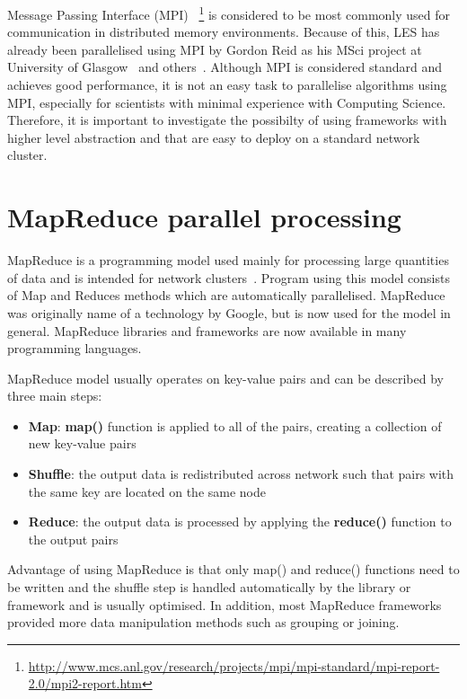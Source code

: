 \documentclass{l4proj}
\begin{document}
Message Passing Interface (MPI)
~\footnote{\url{http://www.mcs.anl.gov/research/projects/mpi/mpi-standard/mpi-report-2.0/mpi2-report.htm}} 
is considered to be most commonly used for communication in distributed memory environments.
Because of this, LES has already been parallelised using MPI by Gordon Reid as his MSci project at University of Glasgow~\cite{les_mpi} and others~\cite{les_palm}. Although MPI is considered standard and achieves good performance, it
is not an easy task to parallelise algorithms using MPI, especially for scientists with minimal
experience with Computing Science. Therefore, it is important to investigate the possibilty
of using frameworks with higher level abstraction and that are easy to deploy on a standard
network cluster.

\section{MapReduce parallel processing}

MapReduce is a programming model used mainly for processing large quantities of data
and is intended for network clusters~\cite{map_reduce}. Program using this model consists of Map and Reduces
methods which are automatically parallelised. MapReduce was originally name of a technology by
Google, but is now used for the model in general. MapReduce libraries and frameworks are now 
available in many programming languages.

MapReduce model usually operates on key-value pairs and can be described by three main steps:

\begin{itemize}  
\item \textbf{Map}: \textbf{map()} function is applied to all of the pairs, creating a collection of new key-value pairs
\item \textbf{Shuffle}: the output data is redistributed across network such that pairs with the same key are located on the same node
\item \textbf{Reduce}: the output data is processed by applying the \textbf{reduce()} function to the output pairs
\end{itemize}

Advantage of using MapReduce is that only map() and reduce() functions need to be written and
the shuffle step is handled automatically by the library or framework and is usually optimised. 
In addition, most MapReduce frameworks provided more data manipulation methods such as grouping or 
joining.
\end{document}
